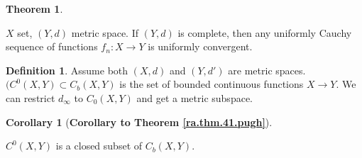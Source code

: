 \documentclass{article}
\theoremstyle{definition}
\newtheorem{theorem}{Theorem}
\theoremstyle{definition}
\theoremstyle{definition}
\theoremstyle{definition}
\newtheorem{corollary}{Corollary}[theorem]
\theoremstyle{definition}
\newtheorem{definition}{Definition}[section]
\theoremstyle{definition}
\theoremstyle{definition}
\begin{document}
\begin{theorem}\label{ra.thm.tricky}

\(X\) set, \((Y,d)\) metric space. If \((Y, d)\) is complete, then any uniformly Cauchy sequence of functions \(f_n: X \to Y\) is uniformly convergent.

\end{theorem}


\begin{definition}

Assume both \((X, d)\) and \((Y, d')\) are metric spaces. \((C^0(X,Y) \subset C_b(X,Y)\) is the set of bounded continuous functions \(X \to Y\). We can restrict \(d_\infty\) to \(C_0(X,Y)\) and get a metric subspace.

\end{definition}


\begin{corollary}[\textbf{Corollary to Theorem \ref{ra.thm.41.pugh}}]\label{ra.thm.41.pugh.cor2}

\(C^0(X,Y)\) is a closed subset of \(C_b(X,Y)\).

\end{corollary}




\end{document}

